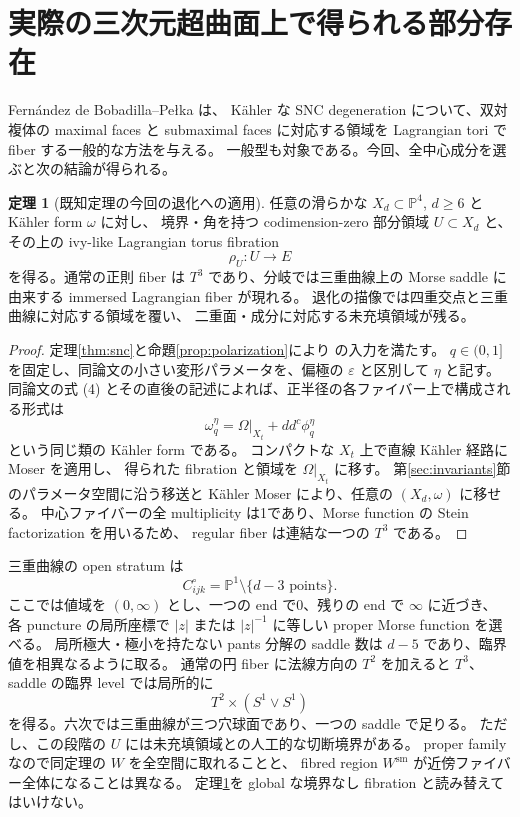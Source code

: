 \documentclass[11pt,a4paper]{article}
\theoremstyle{definition}
\newtheorem{theorem}{定理}[section]
\newcommand{\PP}{\mathbb P}
\newcommand{\eps}{\varepsilon}
\newcommand{\figeight}{(S^1\vee S^1)}
\begin{document}
\section{実際の三次元超曲面上で得られる部分存在}\label{sec:partial}

Fernández de Bobadilla--Pełka \cite[Theorem 6.14]{fbp} は、
Kähler な SNC degeneration について、双対複体の maximal faces と submaximal faces
に対応する領域を Lagrangian tori で fiber する一般的な方法を与える。
一般型も対象である。今回、全中心成分を選ぶと次の結論が得られる。

\begin{theorem}[既知定理の今回の退化への適用]\label{thm:partial}
任意の滑らかな $X_d\subset\PP^4$, $d\ge6$ と Kähler form $\omega$ に対し、
境界・角を持つ codimension-zero 部分領域 $U\subset X_d$ と、
その上の ivy-like Lagrangian torus fibration
\[
\rho_U:U\longrightarrow E
\]
を得る。通常の正則 fiber は $T^3$ であり、分岐では三重曲線上の Morse saddle に由来する
immersed Lagrangian fiber が現れる。
退化の描像では四重交点と三重曲線に対応する領域を覆い、
二重面・成分に対応する未充填領域が残る。
\end{theorem}

\begin{proof}
定理\ref{thm:snc}と命題\ref{prop:polarization}により \cite[Theorem 6.14]{fbp} の入力を満たす。
$q\in(0,1]$ を固定し、同論文の小さい変形パラメータを、偏極の $\eps$ と区別して $\eta$ と記す。
同論文の式 (4) とその直後の記述によれば、正半径の各ファイバー上で構成される形式は
\[
\omega_q^{\eta}=\Omega|_{X_t}+dd^c\phi_q^{\eta}
\]
という同じ類の Kähler form である。
コンパクトな $X_t$ 上で直線 Kähler 経路に Moser を適用し、
得られた fibration と領域を $\Omega|_{X_t}$ に移す。
第\ref{sec:invariants}節のパラメータ空間に沿う移送と Kähler Moser により、任意の $(X_d,\omega)$ に移せる。
中心ファイバーの全 multiplicity は1であり、Morse function の Stein factorization を用いるため、
regular fiber は連結な一つの $T^3$ である。
\end{proof}

三重曲線の open stratum は
\[
C_{ijk}^{\circ}=\PP^1\setminus\{d-3\text{ points}\}.
\]
ここでは値域を $(0,\infty)$ とし、一つの end で0、残りの end で $\infty$ に近づき、
各 puncture の局所座標で $|z|$ または $|z|^{-1}$ に等しい proper Morse function を選べる。
局所極大・極小を持たない pants 分解の saddle 数は $d-5$ であり、臨界値を相異なるように取る。
通常の円 fiber に法線方向の $T^2$ を加えると $T^3$、
saddle の臨界 level では局所的に
\[
T^2\times\figeight
\]
を得る。六次では三重曲線が三つ穴球面であり、一つの saddle で足りる。
ただし、この段階の $U$ には未充填領域との人工的な切断境界がある。
proper family なので同定理の $W$ を全空間に取れることと、
fibred region $W^{\mathrm{sm}}$ が近傍ファイバー全体になることは異なる。
定理\ref{thm:partial}を global な境界なし fibration と読み替えてはいけない。
\end{document}
